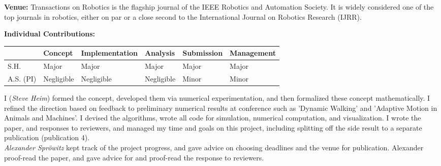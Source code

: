\textbf{Venue: }
Transactions on Robotics is the flagship journal of the IEEE Robotics and Automation Society. It is widely considered one of the top journals in robotics, either on par or a close second to the International Journal on Robotics Research (IJRR). \par
\textbf{Individual Contributions: }
\begin{table}[H]
\begin{tabular}{l|l|l|l|l|l|}
\cline{2-6}
 \textbf{} & \textbf{Concept} & {\footnotesize \textbf{Implementation}} & \textbf{Analysis} & \textbf{Submission} & {\footnotesize \textbf{Management}} \\ \hline
\multicolumn{1}{|l|}{S.H.} & Major & Major & Major & Major & Major \\ \hline
\multicolumn{1}{|l|}{A.S. (PI)} & Negligible & Negligible & Negligible & Minor & Minor \\ \hline
\end{tabular}
\end{table}
I (\emph{Steve Heim}) formed the concept, developed them via numerical experimentation, and then formalized these concept mathematically. I refined the direction based on feedback to preliminary numerical results at conference such as 'Dynamic Walking' and 'Adaptive Motion in Animals and Machines'. I devised the algorithms, wrote all code for simulation, numerical computation, and visualization. I wrote the paper, and responses to reviewers, and managed my time and goals on this project, including splitting off the side result to a separate publication (publication 4). \\
\emph{Alexander Spr\"{o}witz} kept track of the project progress, and gave advice on choosing deadlines and the venue for publication. Alexander proof-read the paper, and gave advice for and proof-read the response to reviewers.


